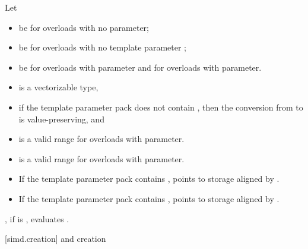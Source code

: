 \begin{itemdescr}
  \pnum
  Let
  \begin{itemize}
    \item {} be  for overloads with no
       parameter;
    \item {} be  for overloads with no template parameter
      ;
    \item {} be  for overloads with  parameter and
       for overloads with  parameter.
  \end{itemize}

  \pnum\mandates
  \begin{itemize}
    \item {} is a vectorizable type,
    \item if the template parameter pack  does not contain \tcode{\convertflag}, then
      the conversion from  to  is value-preserving, and
  \end{itemize}

  \pnum\expects
  \begin{itemize}
    \item {} is a valid range for overloads with  parameter.
    \item {} is a valid range for overloads with  parameter.
    \item If the template parameter pack  contains \tcode{\alignedflag},
       points to storage aligned by .
    \item If the template parameter pack  contains ,
       points to storage aligned by .
  \end{itemize}

  \pnum\effects
  , if  is ,
  evaluates .
\end{itemdescr}

[simd.creation]{ and  creation}

